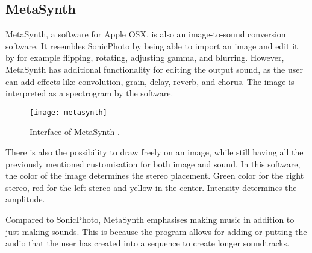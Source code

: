 \subsection{MetaSynth}\label{sub:metasynth}
MetaSynth, a software for Apple OSX, is also an image-to-sound conversion software. It resembles SonicPhoto by being able to import an image and edit it by for example flipping, rotating, adjusting gamma, and blurring. However, MetaSynth has additional functionality for editing the output sound, as the user can add effects like convolution, grain, delay, reverb, and chorus. The image is interpreted as a spectrogram by the software.

\begin{figure}[!h] 
\centering
\texttt{[image: metasynth]}
\caption{\label{fig:metasynth} Interface of MetaSynth \cite{UISoftware2014}.}
\end{figure}

There is also the possibility to draw freely on an image, while still having all the previously mentioned customisation for both image and sound. In this software, the color of the image determines the stereo placement. Green color for the right stereo, red for the left stereo and yellow in the center. Intensity determines the amplitude. 

Compared to SonicPhoto, MetaSynth emphasises making music in addition to just making sounds. This is because the program allows for adding or putting the audio that the user has created into a sequence to create longer soundtracks.